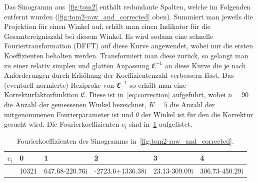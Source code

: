 \documentclass[slug=PET, room=Andreas-Schubert-Bau\,\ 424A, supervisor=Carsten\ Bittrich, coursedate=10.\ 01.\ 2020]{../../Lab_Report_LaTeX/lab_report}
\begin{document}
%      


Das Sinogramm aus~\ref{fig:tom2} enth\"alt redundante Spalten, welche
im Folgenden entfernt wurden (\ref{fig:tom2-raw_and_corrected}
oben). Summiert man jeweils die Projektion f\"ur einen Winkel auf,
erh\"alt man einen Indikator f\"ur die Gesamtereigniszahl bei diesem
Winkel. Es wird sodann eine schnelle Fouriertransformation (DFFT) auf
diese Kurve angewendet, wobei nur die ersten Koeffizienten behalten
werden. Transformiert man diese zur\"uck, so gelangt man zu einer
relativ simplen und glatten Anpassung \(\mathfrak{C}^{-1}\) an diese
Kurve die je nach Anforderungen durch Erh\"ohung der
Koeffizientenzahl verbessern l\"asst. Das (eventuell normierte)
Reziproke von \(\mathfrak{C}^{-1}\) so erh\"alt man eine
Korrekturfaktorfunktion \(\mathfrak{C}\). Diese ist
in~\eqref{eq:correction} aufgef\"uhrt, wobei \(n=90\) die Anzahl der
gemessenen Winkel bezeichnet, \(K=5\) die Anzahl der mitgenommenen
Fourierparameter ist und \(\theta\) der Winkel ist f\"ur den die
Korrektur gesucht wird. Die Fourierkoeffizienten \(c_i\) sind
in~\ref{tab:coeff} aufgelistet.

\begin{table}[h]
  \centering
  \begin{tabular}{l|lllll}
    \toprule
    \(c_i\) & 0 & 1 & 2 & 3 & 4 \\
    \midrule
            & 10321 & 647.68-220.76i & -2723.6+1336.38i & 23.13-309.09i & 306.73-450.29i
  \end{tabular}
  \caption{Fourierkoeffizienten des Sinogramms in~\ref{fig:tom2-raw_and_corrected}.}
  \label{tab:coeff}
\end{table}
\end{document}
